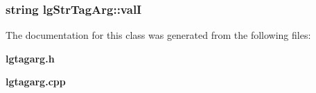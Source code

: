 \subsubsection{\setlength{\rightskip}{0pt plus 5cm}string {\bf lg\-Str\-Tag\-Arg::val\-I}\hspace{0.3cm}{\tt  [private]}}\label{classlgStrTagArg_r0}




The documentation for this class was generated from the following files:\begin{CompactItemize}
\item 
{\bf lgtagarg.h}\item 
{\bf lgtagarg.cpp}\end{CompactItemize}
